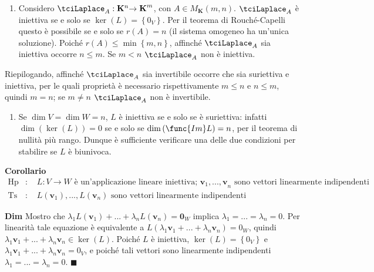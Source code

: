 \documentclass{article}
\begin{document}
\begin{enumerate}
\item Considero $\tciLaplace _{A}:\mathbf{K}^{n}\mathbf{\rightarrow K}^{m}$,
con $A\in M_{\mathbf{K}}\left( m,n\right) $. $\tciLaplace _{A}$ \`{e}
iniettiva se e solo se $\ker \left( L\right) =\left\{ 0_{V}\right\} $. Per
il teorema di Rouch\'{e}-Capelli questo \`{e} possibile se e solo se $%
r\left( A\right) =n$ (il sistema omogeneo ha un'unica soluzione). Poich\'{e} 
$r\left( A\right) \leq \min \left\{ m,n\right\} $, affinch\'{e} $\tciLaplace
_{A}$ sia iniettiva occorre $n\leq m$. Se $m<n$ $\tciLaplace _{A}$ non \`{e}
iniettiva.
\end{enumerate}

Riepilogando, affinch\'{e} $\tciLaplace _{A}$ sia invertibile occorre che
sia suriettiva e iniettiva, per le quali propriet\`{a} \`{e} necessario
rispettivamente $m\leq n$ e $n\leq m$, quindi $m=n$; se $m\neq n$ $%
\tciLaplace _{A}$ non \`{e} invertibile.

\begin{enumerate}
\item Se $\dim V=\dim W=n$, $L$ \`{e} iniettiva se e solo se \`{e}
suriettiva: infatti $\dim \left( \ker \left( L\right) \right) =0$ se e solo
se $\dim \left( \func{Im}L\right) =n$, per il teorema di nullit\`{a} pi\`{u}
rango. Dunque \`{e} sufficiente verificare una delle due condizioni per
stabilire se $L$ \`{e} biunivoca.
\end{enumerate}

\textbf{Corollario}%
\begin{eqnarray*}
\text{Hp} &\text{: }&L:V\rightarrow W\text{ \`{e} un'applicazione lineare
iniettiva; }\mathbf{v}_{1}\mathbf{,...,v}_{n}\text{ sono vettori linearmente
indipendenti} \\
\text{Ts} &\text{: }&L\left( \mathbf{v}_{1}\right) ,...,L\left( \mathbf{v}%
_{n}\right) \text{ sono vettori linearmente indipendenti }
\end{eqnarray*}

\textbf{Dim} Mostro che $\lambda _{1}L\left( \mathbf{v}_{1}\right)
+...+\lambda _{n}L\left( \mathbf{v}_{n}\right) =\mathbf{0}_{W}$ implica $%
\lambda _{1}=...=\lambda _{n}=0$. Per linearit\`{a} tale equazione \`{e}
equivalente a $L\left( \lambda _{1}\mathbf{v}_{1}+...+\lambda _{n}\mathbf{v}%
_{n}\right) =0_{W}$, quindi $\lambda _{1}\mathbf{v}_{1}+...+\lambda _{n}%
\mathbf{v}_{n}\in \ker \left( L\right) $. Poich\'{e} $L$ \`{e} iniettiva, $%
\ker \left( L\right) =\left\{ 0_{V}\right\} $ e $\lambda _{1}\mathbf{v}%
_{1}+...+\lambda _{n}\mathbf{v}_{n}=0_{V}$, e poich\'{e} tali vettori sono
linearmente indipendenti $\lambda _{1}=...=\lambda _{n}=0$. $\blacksquare $
\end{document}
